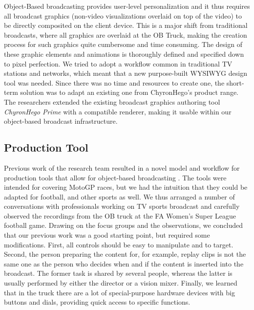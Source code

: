 \documentclass[sigchi-a, authorversion]{acmart}
\begin{document}
Object-Based broadcasting provides user-level personalization and it thus
requires all broadcast graphics (non-video visualizations overlaid on top of
the video) to be directly composited on the client device. This is a major shift
from traditional broadcasts, where all graphics are overlaid at the OB Truck,
making the creation process for such graphics quite cumbersome and time consuming.
The design of these graphic elements and animations is thoroughly defined and
specified down to pixel perfection. We tried to adopt a workflow common in traditional
TV stations and networks, which meant that a new purpose-built WYSIWYG design
tool was needed. Since there was no time and resources to create one, the
short-term solution was to adapt an existing one from ChyronHego's product range. The researchers extended the existing
broadcast graphics authoring tool \emph{ChyronHego Prime} with a compatible renderer,
making it usable within our object-based broadcast infrastructure.

\subsection{Production Tool}

Previous work of the research team resulted in a novel model and workflow for
production tools that allow for object-based broadcasting \cite{Li:2018_TVX,jansen2018}.
The tools were intended for covering MotoGP races, but we had the intuition that
they could be adapted for football, and other sports as well. We thus arranged a number
of conversations with professionals working on TV sports broadcast and carefully
observed the recordings from the OB truck at the FA Women's Super League football
game. Drawing on the focus groups and the observations, we concluded that our previous
work was a good starting point, but required some modifications. First, all
controls should be easy to manipulate and to target. Second, the person
preparing the content for, for example, replay clips is not the same one as the
person who decides when and if the content is inserted into the broadcast. The
former task is shared by several people, whereas the latter is usually performed
by either the director or a vision mixer. Finally, we learned that in the truck
there are a lot of special-purpose hardware devices with big buttons and dials,
providing quick access to specific functions.
\end{document}
